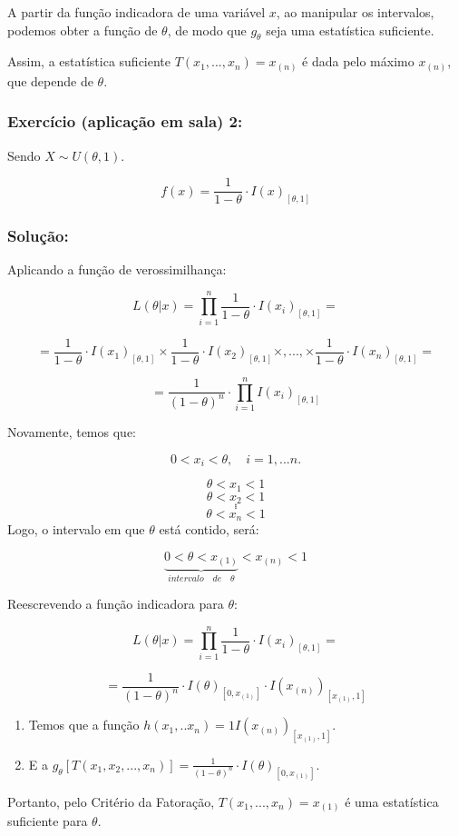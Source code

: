 \documentclass[
  letterpaper,
  DIV=11,
  numbers=noendperiod]{scrartcl}
\providecommand{\tightlist}{%
  \setlength{\itemsep}{0pt}\setlength{\parskip}{0pt}}\usepackage{longtable,booktabs,array}
\begin{document}
A partir da função indicadora de uma variável \(x\), ao manipular os
intervalos, podemos obter a função de \(\theta\), de modo que
\(g_{\theta}\) seja uma estatística suficiente.

Assim, a estatística suficiente \(T(x_{1},...,x_{n})= x_{(n)}\) é dada
pelo máximo \(x_{(n)}\), que depende de \(\theta\).

\subsubsection{Exercício (aplicação em sala)
2:}\label{exercuxedcio-aplicauxe7uxe3o-em-sala-2}

Sendo \(X ∼ U(\theta,1)\).

\[
f(x)=\frac{1}{1-\theta} \cdot I(x)_{[\theta,1]}
\]

\subsubsection{Solução:}\label{soluuxe7uxe3o-1}

Aplicando a função de verossimilhança:

\[
L(\theta|x) = \prod_{i=1}^{n} \frac{1}{1-\theta} \cdot I(x_i)_{[\theta,1]}= 
\]

\[
= \frac{1}{1-\theta} \cdot I(x_1)_{[\theta,1]} \times \frac{1}{1-\theta} \cdot I(x_2)_{[\theta,1]} \times,..., \times \frac{1}{1-\theta} \cdot I(x_n)_{[\theta,1]}=   
\]

\[
= \frac{1}{(1-\theta)^{n}} \cdot \prod_{i=1}^{n} I(x_i)_{[\theta,1]}
\]

Novamente, temos que:

\[
0 < x_i < \theta, \quad i=1,...n.
\]

\[
\theta < x_1 < 1
\] \[
\theta < x_2 < 1
\] \[
.
\] \[
.
\] \[
.
\] \[
\theta < x_n < 1
\] Logo, o intervalo em que \(\theta\) está contido, será:

\[
\underbrace{0< \theta < x_{(1)}}_{intervalo \quad de \quad \theta}< x_{(n)} < 1
\]

Reescrevendo a função indicadora para \(\theta\):

\[
L(\theta|x) = \prod_{i=1}^{n} \frac{1}{1-\theta} \cdot I(x_i)_{[\theta,1]}= 
\]

\[
= \frac{1}{(1-\theta)^{n}} \cdot I(\theta)_{[0,x_{(1)}]} \cdot I(x_{(n)})_{[x_{(1)}, 1]}
\]

\begin{enumerate}
\def\labelenumi{\arabic{enumi}.}
\tightlist
\item
  Temos que a função \(h(x_1,..x_n) = 1I(x_{(n)})_{[x_{(1)}, 1]}\).
\item
  E a
  \(g_\theta[T(x_1,x_2,...,x_n)] = \frac{1}{(1-\theta)^{n}} \cdot I(\theta)_{[0,x_{(1)}]}\).
\end{enumerate}

Portanto, pelo Critério da Fatoração, \(T(x_{1},...,x_{n})= x_{(1)}\) é
uma estatística suficiente para \(\theta\).
\end{document}
